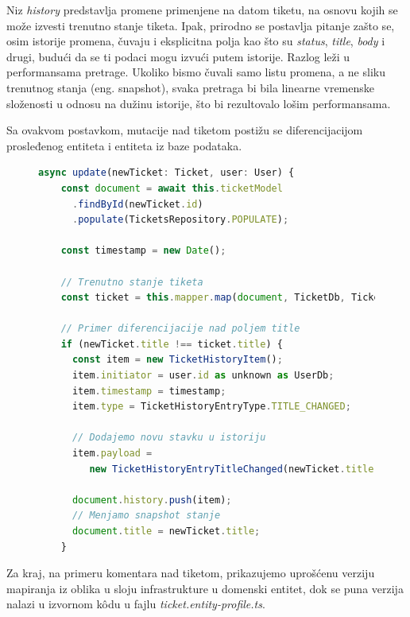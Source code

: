 \documentclass[12pt,oneside]{memoir}
\begin{document}
\newpage
Niz \textit{history} predstavlja promene primenjene na datom tiketu, na osnovu kojih se može izvesti trenutno stanje tiketa. Ipak, prirodno se postavlja pitanje zašto se, osim istorije promena, čuvaju i eksplicitna polja kao što su \textit{status}, \textit{title}, \textit{body} i drugi, budući da se ti podaci mogu izvući putem istorije. Razlog leži u performansama pretrage. Ukoliko bismo čuvali samo listu promena, a ne sliku trenutnog stanja (eng. snapshot), svaka pretraga bi bila linearne vremenske složenosti u odnosu na dužinu istorije, što bi rezultovalo lošim performansama.

Sa ovakvom postavkom, mutacije nad tiketom postižu se diferencijacijom prosleđenog entiteta i entiteta iz baze podataka.

\begin{figure}[h]
\begin{lstlisting}[language=JavaScript, style=ES6, caption={Fajl \textit{ticket.repository.ts}}]
  async update(newTicket: Ticket, user: User) {
    const document = await this.ticketModel
      .findById(newTicket.id)
      .populate(TicketsRepository.POPULATE); 

    const timestamp = new Date();

    // Trenutno stanje tiketa
    const ticket = this.mapper.map(document, TicketDb, Ticket);

    // Primer diferencijacije nad poljem title
    if (newTicket.title !== ticket.title) {
      const item = new TicketHistoryItem();
      item.initiator = user.id as unknown as UserDb;
      item.timestamp = timestamp;
      item.type = TicketHistoryEntryType.TITLE_CHANGED;

      // Dodajemo novu stavku u istoriju
      item.payload = 
         new TicketHistoryEntryTitleChanged(newTicket.title);
         
      document.history.push(item);
      // Menjamo snapshot stanje
      document.title = newTicket.title;
    }
\end{lstlisting}
\end{figure}

Za kraj, na primeru komentara nad tiketom, prikazujemo uprošćenu verziju mapiranja iz oblika u sloju infrastrukture u domenski entitet, dok se puna verzija nalazi u izvornom k\^{o}du u fajlu \textit{ticket.entity-profile.ts}.
\end{document}
